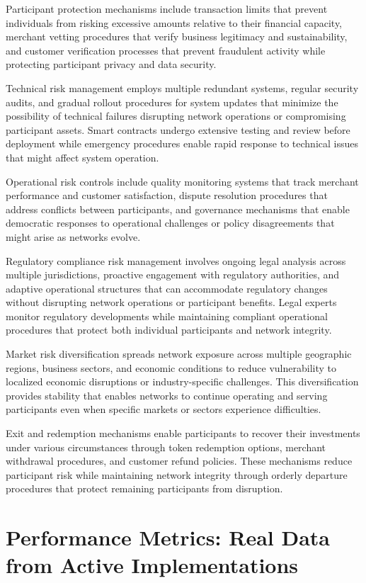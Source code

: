\documentclass[
  Letterpaper,
]{scrbook}
\begin{document}
Participant protection mechanisms include transaction limits that
prevent individuals from risking excessive amounts relative to their
financial capacity, merchant vetting procedures that verify business
legitimacy and sustainability, and customer verification processes that
prevent fraudulent activity while protecting participant privacy and
data security.

Technical risk management employs multiple redundant systems, regular
security audits, and gradual rollout procedures for system updates that
minimize the possibility of technical failures disrupting network
operations or compromising participant assets. Smart contracts undergo
extensive testing and review before deployment while emergency
procedures enable rapid response to technical issues that might affect
system operation.

Operational risk controls include quality monitoring systems that track
merchant performance and customer satisfaction, dispute resolution
procedures that address conflicts between participants, and governance
mechanisms that enable democratic responses to operational challenges or
policy disagreements that might arise as networks evolve.

Regulatory compliance risk management involves ongoing legal analysis
across multiple jurisdictions, proactive engagement with regulatory
authorities, and adaptive operational structures that can accommodate
regulatory changes without disrupting network operations or participant
benefits. Legal experts monitor regulatory developments while
maintaining compliant operational procedures that protect both
individual participants and network integrity.

Market risk diversification spreads network exposure across multiple
geographic regions, business sectors, and economic conditions to reduce
vulnerability to localized economic disruptions or industry-specific
challenges. This diversification provides stability that enables
networks to continue operating and serving participants even when
specific markets or sectors experience difficulties.

Exit and redemption mechanisms enable participants to recover their
investments under various circumstances through token redemption
options, merchant withdrawal procedures, and customer refund policies.
These mechanisms reduce participant risk while maintaining network
integrity through orderly departure procedures that protect remaining
participants from disruption.

\section{Performance Metrics: Real Data from Active
Implementations}\label{performance-metrics-real-data-from-active-implementations}
\end{document}
